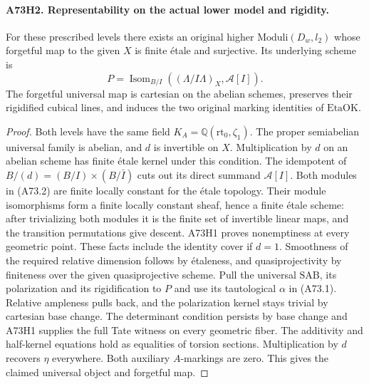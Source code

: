 \paragraph{A73H2. Representability on the actual lower model and rigidity.}
\label{claim:A73H2}
For these prescribed levels there exists an original higher
$\mathrm{Moduli}(D_w,l_2)$ whose forgetful map to the given $X$ is
finite \'etale and surjective. Its underlying scheme is
\[
 P=\operatorname{Isom}_{B/I}
       ((\Lambda/I\Lambda)_X,\mathcal A[I]).
 \tag{A73.2}
\]
The forgetful universal map is cartesian on the abelian schemes,
preserves their rigidified cubical lines, and induces the two
original marking identities of $\mathrm{EtaOK}$.

\begin{proof}
Both levels have the same field
$K_A=\mathbb Q(\mathrm{rt}_0,\zeta_1)$.
The proper semiabelian universal family is abelian, and $d$
is invertible on $X$. Multiplication by $d$ on an abelian scheme
has finite \'etale kernel under this condition. The idempotent of
$B/(d)=(B/I)\times(B/\bar I)$ cuts out its direct summand
$\mathcal A[I]$. Both modules in (A73.2) are finite locally
constant for the \'etale topology. Their module isomorphisms form
a finite locally constant sheaf, hence a finite \'etale scheme:
after trivializing both modules it is the finite set of invertible
linear maps, and the transition permutations give descent.
A73H1 proves nonemptiness at every geometric point. These facts
include the identity cover if $d=1$. Smoothness of the required
relative dimension follows by \'etaleness, and quasiprojectivity
by finiteness over the given quasiprojective scheme. Pull the
universal $\mathrm{SAB}$, its polarization and its rigidification
to $P$ and use its tautological $\alpha$ in (A73.1). Relative
ampleness pulls back, and the polarization kernel stays trivial
by cartesian base change. The determinant
condition persists by base change and A73H1 supplies the full Tate
witness on every geometric fiber. The additivity and half-kernel
equations hold as equalities of torsion sections. Multiplication
by $d$ recovers $\eta$ everywhere. Both auxiliary $A$-markings
are zero. This gives the claimed universal object and forgetful map.


\end{proof}
